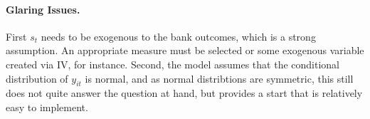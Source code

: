 \documentclass[11pt]{article}
\begin{document}
\paragraph{Glaring Issues.}
First $s_t$ needs to be exogenous to the bank outcomes, which is a strong assumption. An appropriate measure must be selected or some exogenous variable created via IV, for instance. Second, the model assumes that the conditional distribution of $y_{it}$ is normal, and as normal distribtions are symmetric, this still does not quite answer the question at hand, but provides a start that is relatively easy to implement. 
\end{document}
